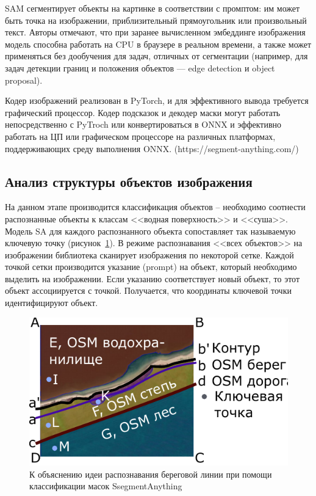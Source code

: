 \documentclass[732,14pt,final]{studrep}
\begin{document}
SAM сегментирует объекты на картинке в соответствии с промптом: им может быть точка на изображении, приблизительный прямоугольник или произвольный текст. Авторы отмечают, что при заранее вычисленном эмбеддинге изображения модель способна работать на CPU в браузере в реальном времени, а также может применяться без дообучения для задач, отличных от сегментации (например, для задач детекции границ и положения объектов — edge detection и object proposal).

Кодер изображений реализован в PyTorch, и для эффективного вывода требуется графический процессор.
Кодер подсказок и декодер маски могут работать непосредственно с PyTroch или конвертироваться в ONNX и эффективно работать на ЦП или графическом процессоре на различных платформах, поддерживающих среду выполнения ONNX. (https://segment-anything.com/)

\subsection{Анализ структуры объектов изображения}

На данном этапе производится классификация объектов -- необходимо соотнести распознанные объекты к классам <<водная поверхность>> и <<суша>>. Модель SA для каждого распознанного объекта сопоставляет так называемую ключевую точку (рисунок~\ref{fig:objsanalysis}). В режиме распознавания <<всех объектов>> на изображении библиотека сканирует изображения по некоторой сетке. Каждой точкой сетки производится указание (prompt) на объект, который необходимо выделить на изображении. Если указанию соответствует новый объект, то этот объект ассоциируется с точкой. Получается, что координаты ключевой точки идентифицируют объект.

  \begin{figure}
    \centering
  \includegraphics[width=0.7\linewidth]{pics/tracing-p.pdf}
  \caption{К объяснению идеи распознавания береговой линии при помощи классификации масок SsegmentAnything}\label{fig:objsanalysis}
\end{figure}
\end{document}
